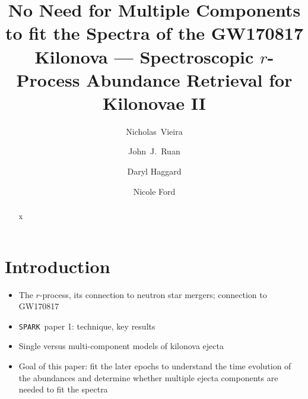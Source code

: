 \documentclass[twocolumn, twocolappendix]{aastex63}
\def\SPARK{\texttt{SPARK}}
\begin{document}
\title{No Need for Multiple Components to fit the Spectra of the GW170817 Kilonova --- Spectroscopic $r$-Process Abundance Retrieval for Kilonovae II}


\author[0000-0001-7815-7604]{Nicholas~Vieira}

\author[0000-0001-8665-5523]{John~J.~Ruan}

\author[0000-0001-6803-2138]{Daryl Haggard}

\author[0000-0001-8921-3624]{Nicole Ford}






\begin{abstract}
x
\end{abstract}


\section{Introduction}\label{sec:intro}

\begin{itemize}

    \item The $r$-process, its connection to neutron star mergers; connection to GW170817

    \item \SPARK~paper 1: technique, key results
    
    \item Single versus multi-component models of kilonova ejecta
    
    \item Goal of this paper: fit the later epochs to understand the time evolution of the abundances and determine whether multiple ejecta components are needed to fit the spectra
    
\end{itemize}
\end{document}
